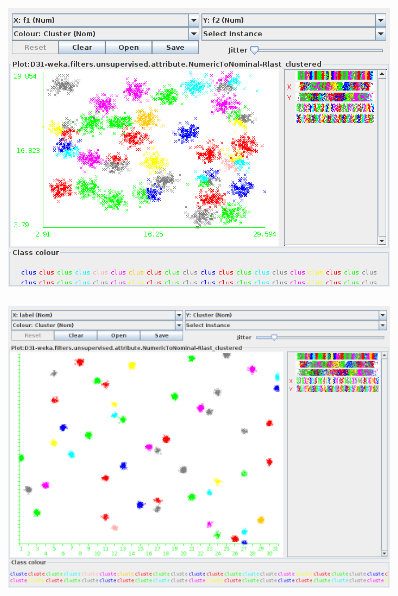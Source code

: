 \documentclass[paper=a4, fontsize=11pt]{scrartcl}
\numberwithin{equation}{section}		%
\numberwithin{figure}{section}			%
\numberwithin{table}{section}				%
\begin{document}
\begin{figure}[H]
	\centering
  \includegraphics[width=0.9\textwidth]{6c}{\label{k=50: f1 vs f2}}
\end{figure}

\begin{figure}[H]
	\centering
  \includegraphics[width=0.9\textwidth]{6d}{\label{k=50: cluster vs label}}
\end{figure}
\end{document}
